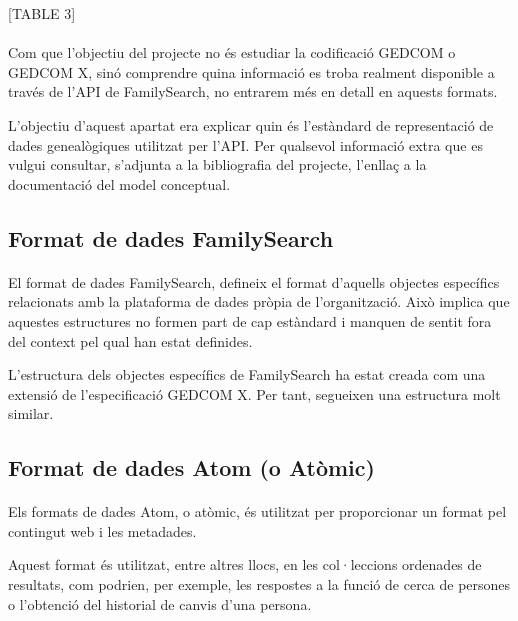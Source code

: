          [TABLE 3]

         \paragraph{}
         Com que l’objectiu del projecte no és estudiar la codificació GEDCOM o GEDCOM X, sinó comprendre quina informació es troba realment disponible a través de l'API de FamilySearch, no entrarem més en detall en aquests formats.

         L’objectiu d’aquest apartat era explicar quin és l'estàndard de representació de dades genealògiques utilitzat per l'API. Per qualsevol informació extra que es vulgui consultar, s’adjunta a la bibliografia del projecte, l’enllaç a la documentació del model conceptual.


     \subsection{Format de dades FamilySearch}

        \paragraph{}
        El format de dades FamilySearch, defineix el format d'aquells objectes específics relacionats amb la plataforma de dades pròpia de l'organització. Això implica que aquestes estructures no formen part de cap estàndard i manquen de sentit fora del context pel qual han estat definides.

        L'estructura dels objectes específics de FamilySearch ha estat creada com una extensió de l'especificació GEDCOM X. Per tant, segueixen una estructura molt similar.


    \subsection{Format de dades Atom (o Atòmic)}

        \paragraph{}
        Els formats de dades Atom, o atòmic, és utilitzat per proporcionar un format pel contingut web i les metadades.

        Aquest format és utilitzat, entre altres llocs, en les col·leccions ordenades de resultats, com podrien, per exemple, les respostes a la funció de cerca de persones o l'obtenció del historial de canvis d’una persona.



